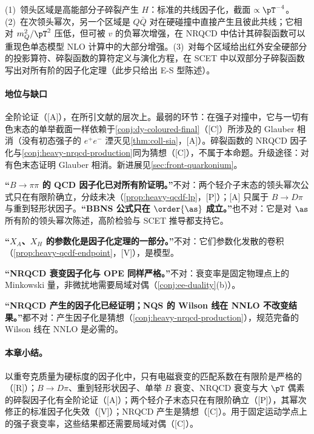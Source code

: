 \begin{proofsketch}
(1)~领头区域是高能部分子碎裂产生 $H$：标准的共线因子化，截面 $\propto\pT^{-4}$。(2)~在次领头幂次，另一个区域是 $Q\bar Q$ 对在硬碰撞中直接产生且彼此共线；它相对 $m_Q^2/\pT^2$ 压低，但可被 $v$ 的负幂次增强\cite{Fleming:2012wy}，在 NRQCD 中估计其碎裂函数可以重现色单态模型 NLO 计算中的大部分增强\cite{Kang:2011mg}。(3)~对每个区域给出红外安全硬部分的投影算符、碎裂函数的算符定义与演化方程\cite{Kang:2014tta}，在 SCET 中以双部分子碎裂函数写出对所有阶的因子化定理\cite{Fleming:2012wy}（此步只给出 E-S 型陈述）。
\end{proofsketch}

\paragraph{地位与缺口}
全阶论证（[A]），在所引文献\cite{Kang:2011mg,Kang:2014tta,Fleming:2012wy}的层次上。最弱的环节：在强子对撞中，它与一切有色末态的单举截面一样依赖于\cref{conj:dy-coloured-final}（[C]）所涉及的 Glauber 相消（没有初态强子的 $e^+e^-$ 湮灭见\cref{thm:coll-sia}，[A]）。碎裂函数的 NRQCD 因子化与\cref{conj:heavy-nrqcd-production}同为猜想（[C]），不属于本命题。升级途径：对有色末态证明 Glauber 相消。新进展见\cref{sec:front-quarkonium}。

\begin{tcolorbox}[enhanced,breakable,title=常见误解,fonttitle=\bfseries,
  colback=gray!3!white,colframe=gray!55!black,boxrule=0.6pt,arc=2pt,
  left=5pt,right=5pt,top=3pt,bottom=3pt,before skip=6pt,after skip=6pt]
\textbf{“$B\to\pi\pi$ 的 QCD 因子化已对所有阶证明。”}不对：两个轻介子末态的领头幂次公式只在有限阶确立，分歧未决（\cref{prop:heavy-qcdf-lp}，[P]）；[A] 只属于 $B\to D\pi$ 与重到轻形状因子。\textbf{“BBNS 公式只在 $\order{\as}$ 成立。”}也不对：它是对 $\as$ 所有阶的领头幂次陈述，高阶检验与 SCET 推导都支持它。\par
\textbf{“$X_A$、$X_H$ 的参数化是因子化定理的一部分。”}不对：它们参数化发散的卷积（\cref{prop:heavy-qcdf-endpoint}，[V]），是模型。\par
\textbf{“NRQCD 衰变因子化与 OPE 同样严格。”}不对：衰变率是固定物理点上的 Minkowski 量，非微扰地需要局域对偶（\cref{conj:ee-duality}(b)）。\par
\textbf{“NRQCD 产生的因子化已经证明；NQS 的 Wilson 线在 NNLO 不改变结果。”}都不对：产生因子化是猜想（\cref{conj:heavy-nrqcd-production}），规范完备的 Wilson 线在 NNLO 是必需的。
\end{tcolorbox}

\paragraph{本章小结。}
以重夸克质量为硬标度的因子化中，只有电磁衰变的匹配系数在有限阶是严格的（[R]）；$B\to D\pi$、重到轻形状因子、单举 $B$ 衰变、NRQCD 衰变与大 $\pT$ 偶素的碎裂因子化有全阶论证（[A]）；两个轻介子末态只在有限阶确立（[P]），其幂次修正的标准因子化失效（[V]）；NRQCD 产生是猜想（[C]）。用于固定运动学点上的强子衰变率，这些结果都还需要局域对偶（[C]）。

